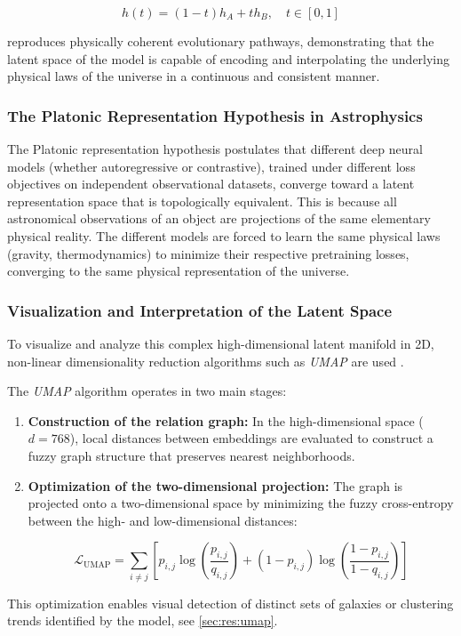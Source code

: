 \begin{equation}
h\left(t\right) = \left(1-t\right)h_A + t h_B, \quad t \in \left[0, 1\right]
\label{eq:latent_interpolation}
\end{equation}

reproduces physically coherent evolutionary pathways, demonstrating that the latent space of the model is capable of encoding and interpolating the underlying physical laws of the universe in a continuous and consistent manner.

\subsubsection{The Platonic Representation Hypothesis in Astrophysics}

The Platonic representation hypothesis \autocites{ar:huh-2024}{ar:duraphe-2025} postulates that different deep neural models (whether autoregressive or contrastive), trained under different loss objectives on independent observational datasets, converge toward a latent representation space that is topologically equivalent. This is because all astronomical observations of an object are projections of the same elementary physical reality. The different models are forced to learn the same physical laws (gravity, thermodynamics) to minimize their respective pretraining losses, converging to the same physical representation of the universe.

\subsubsection{Visualization and Interpretation of the Latent Space}

To visualize and analyze this complex high-dimensional latent manifold in 2D, non-linear dimensionality reduction algorithms such as \textit{\gls{UMAP}} are used \autocite{ar:umap}.

The \textit{\gls{UMAP}} algorithm operates in two main stages:
\begin{enumerate}
\item \textbf{Construction of the relation graph:} In the high-dimensional space ($d = 768$), local distances between embeddings are evaluated to construct a fuzzy graph structure that preserves nearest neighborhoods.
\item \textbf{Optimization of the two-dimensional projection:} The graph is projected onto a two-dimensional space by minimizing the fuzzy cross-entropy between the high- and low-dimensional distances:

\begin{equation}
\mathcal{L}_{\text{UMAP}} = \sum_{i \neq j} \left[ p_{i,j} \log \left(\dfrac{p_{i,j}}{q_{i,j}}\right) + \left(1 - p_{i,j}\right) \log \left(\dfrac{1 - p_{i,j}}{1 - q_{i,j}}\right) \right]
\label{eq:umap_loss}
\end{equation}
\end{enumerate}

This optimization enables visual detection of distinct sets of galaxies or clustering trends identified by the model, see \cref{sec:res:umap}.

